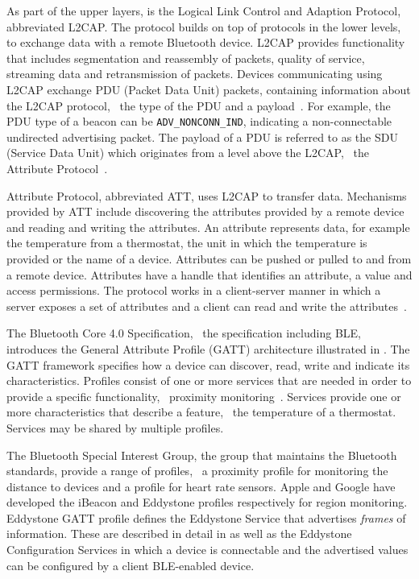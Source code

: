 As part of the upper layers, is the Logical Link Control and Adaption Protocol, abbreviated L2CAP. The protocol builds on top of protocols in the lower levels, to exchange data with a remote Bluetooth device. L2CAP provides functionality that includes segmentation and reassembly of packets, quality of service, streaming data and retransmission of packets. Devices communicating using L2CAP exchange PDU (Packet Data Unit) packets, containing information about the L2CAP protocol, \eg~the type of the PDU and a payload~\cite[pp. 80-83]{gupta2013inside}. For example, the PDU type of a beacon can be \texttt{ADV\_NONCONN\_IND}, indicating a non-connectable undirected advertising packet. The payload of a PDU is referred to as the SDU (Service Data Unit) which originates from a level above the L2CAP, \eg~the Attribute Protocol~\cite[p. 201]{gupta2013inside}.

Attribute Protocol, abbreviated ATT, uses L2CAP to transfer data. Mechanisms provided by ATT include discovering the attributes provided by a remote device and reading and writing the attributes. An attribute represents data, for example the temperature from a thermostat, the unit in which the temperature is provided or the name of a device. Attributes can be pushed or pulled to and from a remote device. Attributes have a handle that identifies an attribute, a value and access permissions. The protocol works in a client-server manner in which a server exposes a set of attributes and a client can read and write the attributes~\cite{gupta2013inside}.

The Bluetooth Core 4.0 Specification, \ie~the specification including BLE, introduces the General Attribute Profile (GATT) architecture illustrated in . The GATT framework specifies how a device can discover, read, write and indicate its characteristics. Profiles consist of one or more services that are needed in order to provide a specific functionality, \eg~proximity monitoring~\cite[p. 259-261]{gupta2013inside}. Services provide one or more characteristics that describe a feature, \eg~the temperature of a thermostat. Services may be shared by multiple profiles.

The Bluetooth Special Interest Group, the group that maintains the Bluetooth standards, provide a range of profiles, \eg~a proximity profile for monitoring the distance to devices and a profile for heart rate sensors.
Apple and Google have developed the iBeacon and Eddystone profiles respectively for region monitoring.
Eddystone GATT profile defines the Eddystone Service that advertises \emph{frames} of information. These are described in detail in  as well as the Eddystone Configuration Services in which a device is connectable and the advertised values can be configured by a client BLE-enabled device.

